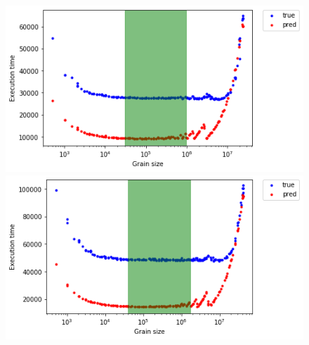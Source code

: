 \begin{figure}[H]
{		\label{fig56:c}}
	\hfill
	{\centering\includegraphics[scale=.4]{images/hpx_for_loop/blazemark/range/marvin_pred_4855_8_10_500.png}	
	\label{fig56:f}}
	{\centering\includegraphics[scale=.4]{images/hpx_for_loop/blazemark/range/marvin_pred_6420_8_10_500.png}	
}
\end{figure}
